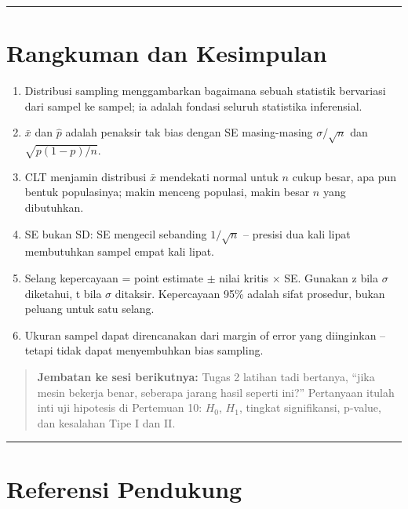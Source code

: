 \documentclass[
  indonesian,
  letterpaper,
]{book}
\providecommand{\tightlist}{%
  \setlength{\itemsep}{0pt}\setlength{\parskip}{0pt}}
\begin{document}
\begin{center}\rule{0.5\linewidth}{0.5pt}\end{center}


\chapter{Rangkuman dan Kesimpulan}\label{rangkuman-dan-kesimpulan}

\begin{enumerate}
\def\labelenumi{\arabic{enumi}.}
\tightlist
\item
  Distribusi sampling menggambarkan bagaimana sebuah statistik
  bervariasi dari sampel ke sampel; ia adalah fondasi seluruh statistika
  inferensial.
\item
  \(\bar{x}\) dan \(\hat{p}\) adalah penaksir tak bias dengan SE
  masing-masing \(\sigma/\sqrt{n}\) dan \(\sqrt{p(1-p)/n}\).
\item
  CLT menjamin distribusi \(\bar{x}\) mendekati normal untuk \(n\) cukup
  besar, apa pun bentuk populasinya; makin menceng populasi, makin besar
  \(n\) yang dibutuhkan.
\item
  SE bukan SD: SE mengecil sebanding \(1/\sqrt{n}\) -- presisi dua kali
  lipat membutuhkan sampel empat kali lipat.
\item
  Selang kepercayaan = point estimate \(\pm\) nilai kritis \(\times\)
  SE. Gunakan z bila \(\sigma\) diketahui, t bila \(\sigma\) ditaksir.
  Kepercayaan 95\% adalah sifat prosedur, bukan peluang untuk satu
  selang.
\item
  Ukuran sampel dapat direncanakan dari margin of error yang diinginkan
  -- tetapi tidak dapat menyembuhkan bias sampling.
\end{enumerate}

\begin{quote}
\textbf{Jembatan ke sesi berikutnya:} Tugas 2 latihan tadi bertanya,
``jika mesin bekerja benar, seberapa jarang hasil seperti ini?''
Pertanyaan itulah inti uji hipotesis di Pertemuan 10: \(H_0\), \(H_1\),
tingkat signifikansi, p-value, dan kesalahan Tipe I dan II.
\end{quote}

\begin{center}\rule{0.5\linewidth}{0.5pt}\end{center}


\chapter{Referensi Pendukung}\label{referensi-pendukung}
\end{document}
